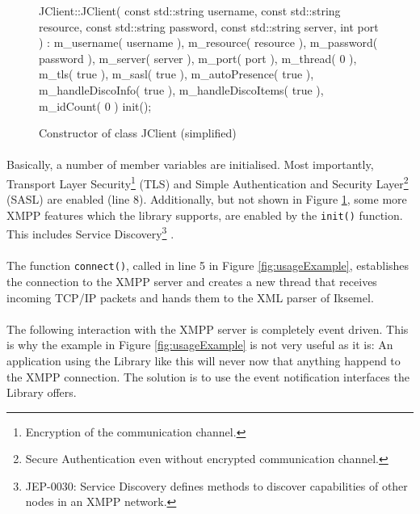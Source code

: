 \begin{figure}[H]
\begin{listing}{1}
JClient::JClient( const std::string username,
                  const std::string resource,
                  const std::string password,
                  const std::string server, int port )
  : m_username( username ), m_resource( resource ),
    m_password( password ), m_server( server ),
    m_port( port ), m_thread( 0 ),
    m_tls( true ), m_sasl( true ),
    m_autoPresence( true ), m_handleDiscoInfo( true ),
    m_handleDiscoItems( true ), m_idCount( 0 )
{
  init();
}
\end{listing}
\caption{Constructor of class JClient (simplified)}
\label{fig:JClientConstructor}
\end{figure}

\paragraph{}
Basically, a number of member variables are initialised. Most importantly, Transport Layer Security\footnote{Encryption of the communication channel.} (TLS) \cite{rfcXXX} and Simple Authentication and Security Layer\footnote{Secure Authentication even without encrypted communication channel.} (SASL) \cite{rfcYYY} are enabled (line 8). Additionally, but not shown in Figure \ref{fig:JClientConstructor}, some more XMPP features which the library supports, are enabled by the \texttt{init()} function. This includes Service Discovery\footnote{JEP-0030: Service Discovery defines methods to discover capabilities of other nodes in an XMPP network.} \cite{jep0030}.

\paragraph{}
The function \texttt{connect()}, called in line 5 in Figure \ref{fig:usageExample}, establishes the connection to the XMPP server and creates a new thread that receives incoming TCP/IP packets and hands them to the XML parser of Iksemel.

\paragraph{}
The following interaction with the XMPP server is completely event driven. This is why the example in Figure \ref{fig:usageExample} is not very useful as it is: An application using the Library like this will never now that anything happend to the XMPP connection. The solution is to use the event notification interfaces the Library offers.

